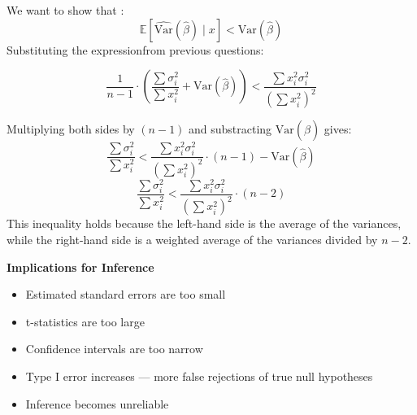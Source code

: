 \documentclass{article}
\begin{document}
\begin{flushleft}
\begin{enumerate}
We want to show that :
\[
\mathbb{E}[\widehat{\text{Var}}(\hat{\beta}) \mid x] < \text{Var}(\hat{\beta})
\]
Substituting the expressionfrom previous questions:

\[
    \frac{1}{n - 1} \cdot \left( \frac{\sum \sigma_i^2}{\sum x_i^2} + \text{Var}(\hat{\beta}) \right) < \frac{\sum x_i^2 \sigma_i^2}{\left( \sum x_i^2 \right)^2}
\]

Multiplying both sides by $(n-1)$ and substracting $\text{Var}(\hat{\beta})$ gives:
\[
    \frac{\sum \sigma_i^2}{\sum x_i^2} < \frac{\sum x_i^2 \sigma_i^2}{\left( \sum x_i^2 \right)^2} \cdot (n-1) -\text{Var}(\hat{\beta})
\]
\[
    \frac{\sum \sigma_i^2}{\sum x_i^2} < \frac{\sum x_i^2 \sigma_i^2}{\left( \sum x_i^2 \right)^2} \cdot (n-2)
\]
This inequality holds because the left-hand side is the average of the variances, while the right-hand side is a weighted average of the variances divided by $n-2$.

\textbf{Implications for Inference}

\begin{itemize}
  \item Estimated standard errors are too small
  \item t-statistics are too large
  \item Confidence intervals are too narrow
  \item Type I error increases — more false rejections of true null hypotheses
  \item Inference becomes unreliable
\end{itemize}

\end{enumerate}
\end{flushleft}
\end{document}
